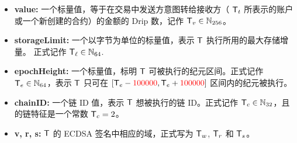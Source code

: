 \begin{itemize} [nosep]
	\item {\bf value:} 一个标量值，等于在交易中发送方意图转给接收方（ $\textsf{T}_t$ 所表示的账户或一个新创建的合约）的金额的 Drip 数，记作  $\textsf{T}_v\in\mathbb{N}_{256}$。


	\item {\bf storageLimit:} 
	一个以字节为单位的标量值，表示 $\textsf{T}$ 执行所用的最大存储增量。
	正式记作 $\textsf{T}_{\ell}\in\mathbb{N}_{64}$.

	\item {\bf epochHeight:} 
	一个标量值，标明 $\textsf{T}$ 可被执行的纪元区间。正式记作 $\textsf{T}_e\in\mathbb{N}_{64}$，表示 $\textsf{T}$ 只可在 $[\textsf{T}_e - {\color{red}100000}, \textsf{T}_e + {\color{red}100000}]$ 区间内的纪元被执行。

	\item {\bf chainID:} 
	一个链 ID 值，表示 $\textsf{T}$ 想被执行的链 ID。正式记作 $\textsf{T}_c\in\mathbb{N}_{32}$，且 {\name} 的链特征是一个常数 $\textsf{T}_c=2$。

	\item {\bf v, r, s:} 
	$\textsf{T}$ 的 ECDSA 签名中相应的域，正式写为 $\textsf{T}_w$, $\textsf{T}_r$ 和 $\textsf{T}_s$。 
\end{itemize}

